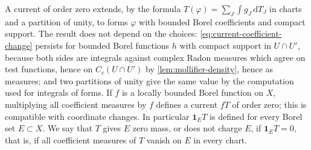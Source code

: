 A current of order zero extends, by the formula $T(\varphi)=\sum_J\int g_J\,\mathrm dT_J$ in charts and a partition of unity, to forms $\varphi$ with bounded Borel coefficients and compact support. The result does not depend on the choices: \eqref{eq:current-coefficient-change} persists for bounded Borel functions $h$ with compact support in $U\cap U'$, because both sides are integrals against complex Radon measures which agree on test functions, hence on $C_c(U\cap U')$ by \cref{lem:mollifier-density}, hence as measures; and two partitions of unity give the same value by the computation used for integrals of forms. If $f$ is a locally bounded Borel function on $X$, multiplying all coefficient measures by $f$ defines a current $fT$ of order zero; this is compatible with coordinate changes. In particular $\mathbf 1_ET$ is defined for every Borel set $E\subset X$. We say that $T$ gives $E$ zero mass, or does not charge $E$, if $\mathbf 1_ET=0$, that is, if all coefficient measures of $T$ vanish on $E$ in every chart.

